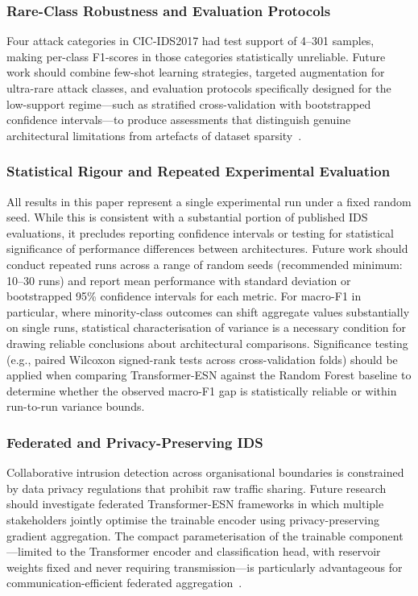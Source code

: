\documentclass[5p,times]{elsarticle}
\begin{document}
	\subsubsection{Rare-Class Robustness and Evaluation Protocols}
	
	Four attack categories in CIC-IDS2017 had test support of
	4--301 samples, making per-class F1-scores in those categories
	statistically unreliable. Future work should combine few-shot
	learning strategies, targeted augmentation for ultra-rare attack
	classes, and evaluation protocols specifically designed for the
	low-support regime---such as stratified cross-validation with
	bootstrapped confidence intervals---to produce assessments that
	distinguish genuine architectural limitations from artefacts of
	dataset sparsity~\cite{ring2019survey,thakkar2020,zhou2020ensemble}.
	
	\subsubsection{Statistical Rigour and Repeated Experimental Evaluation}
	
	All results in this paper represent a single experimental run under a
	fixed random seed. While this is consistent with a substantial portion
	of published IDS evaluations, it precludes reporting confidence
	intervals or testing for statistical significance of performance
	differences between architectures. Future work should conduct repeated
	runs across a range of random seeds (recommended minimum: 10--30 runs)
	and report mean performance with standard deviation or bootstrapped
	95\% confidence intervals for each metric. For macro-F1 in particular,
	where minority-class outcomes can shift aggregate values substantially
	on single runs, statistical characterisation of variance is a necessary
	condition for drawing reliable conclusions about architectural
	comparisons. Significance testing (e.g., paired Wilcoxon signed-rank
	tests across cross-validation folds) should be applied when comparing
	Transformer-ESN against the Random Forest baseline to determine whether
	the observed macro-F1 gap is statistically reliable or within
	run-to-run variance bounds.
	
	\subsubsection{Federated and Privacy-Preserving IDS}
	
	Collaborative intrusion detection across organisational
	boundaries is constrained by data privacy regulations that
	prohibit raw traffic sharing. Future research should
	investigate federated Transformer-ESN frameworks in
	which multiple stakeholders jointly optimise the trainable
	encoder using privacy-preserving gradient aggregation. The
	compact parameterisation of the trainable component---limited
	to the Transformer encoder and classification head, with
	reservoir weights fixed and never requiring
	transmission---is particularly advantageous for
	communication-efficient federated
	aggregation~\cite{buczak2016survey,khraisat2019survey}.
	
\end{document}
